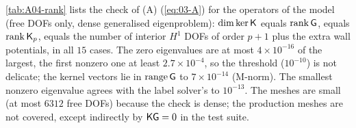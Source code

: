 \cref{tab:A04-rank} lists the check of (A) (\cref{eq:03-A}) for the operators of the model (free DOFs only, dense generalised eigenproblem): $\dim\ker\mathsf{K}$ equals $\operatorname{rank}\mathsf{G}$, equals $\operatorname{rank}\Kp$, equals the number of interior $H^1$ DOFs of order $p+1$ plus the extra wall potentials, in all $15$ cases.
The zero eigenvalues are at most $4\times10^{-16}$ of the largest, the first nonzero one at least $2.7\times10^{-4}$, so the threshold ($10^{-10}$) is not delicate; the kernel vectors lie in $\mathrm{range}\,\mathsf{G}$ to $7\times10^{-14}$ (M-norm).
The smallest nonzero eigenvalue agrees with the label solver's to $10^{-13}$.
The meshes are small (at most $6312$ free DOFs) because the check is dense; the production meshes are not covered, except indirectly by $\mathsf{K}\mathsf{G}=0$ in the test suite.

